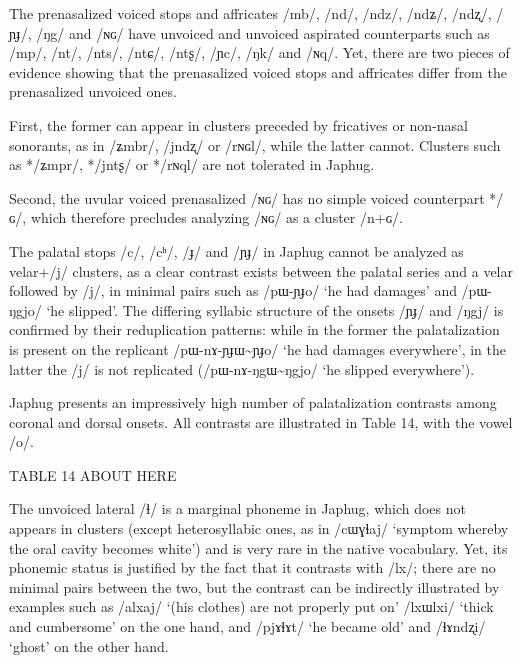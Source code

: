 \documentclass[12pt]{article}
\newcommand{\ipa}[1]{\mbox{\phon/#1/}}
\newcommand{\tld}{\textasciitilde{}}
\begin{document}
The prenasalized voiced stops and affricates \ipa{mb}, \ipa{nd}, \ipa{ndz}, \ipa{ndʑ}, \ipa{ndʐ}, \ipa{ɲɟ}, \ipa{ŋg} and \ipa{ɴɢ} have unvoiced and unvoiced aspirated counterparts such as \ipa{mp}, \ipa{nt}, \ipa{nts}, \ipa{ntɕ}, \ipa{ntʂ}, \ipa{ɲc}, \ipa{ŋk} and \ipa{ɴq}. Yet, there are two pieces of evidence showing that the prenasalized voiced stops and affricates differ from the prenasalized unvoiced ones. 

First, the former can appear in clusters preceded by fricatives or non-nasal sonorants, as in \ipa{ʑmbr}, \ipa{jndʐ} or \ipa{rɴɢl}, while the latter cannot. Clusters such as *\ipa{ʑmpr}, *\ipa{jntʂ} or *\ipa{rɴql} are not tolerated in Japhug.

Second, the uvular voiced prenasalized \ipa{ɴɢ} has no simple voiced counterpart *\ipa{ɢ}, which therefore precludes analyzing \ipa{ɴɢ} as a cluster \ipa{n+ɢ}.

The palatal stops \ipa{c}, \ipa{cʰ}, \ipa{ɟ} and \ipa{ɲɟ} in Japhug cannot be analyzed as velar+\ipa{j} clusters, as a clear contrast exists between the palatal series and a velar followed by \ipa{j}, in minimal pairs such as   \ipa{pɯ-ɲɟo} `he had damages' and \ipa{pɯ-ŋgjo} `he slipped'. The differing syllabic structure of the onsets \ipa{ɲɟ} and \ipa{ŋgj} is confirmed by their reduplication patterns: while in the former the palatalization is present on the replicant \ipa{pɯ-nɤ-ɲɟɯ\tld{}ɲɟo} `he had damages everywhere', in the latter the \ipa{j} is not replicated (\ipa{pɯ-nɤ-ŋgɯ\tld{}ŋgjo} `he slipped everywhere').

Japhug presents an impressively high number of palatalization contrasts among coronal and dorsal onsets. All contrasts are illustrated in Table 14, with the vowel \ipa{o}.

TABLE 14 ABOUT HERE   
 
The unvoiced lateral  \ipa{ɬ} is a marginal phoneme in Japhug, which does not appears in clusters (except heterosyllabic ones, as in \ipa{cɯɣɬaj} `symptom whereby the oral cavity becomes white') and is very rare in the native vocabulary. Yet, its phonemic status is justified by the fact that it contrasts with \ipa{lx}; there are no minimal pairs between the two, but the contrast can be indirectly illustrated by examples such as \ipa{alxaj} `(his clothes) are not properly put on' \ipa{lxɯlxi} `thick and cumbersome' on the one hand, and \ipa{pjɤɬɤt} `he became old' and \ipa{ɬɤndʐi} `ghost' on the other hand.
\end{document}
